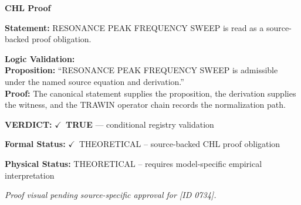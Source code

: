\vspace{0.45em}
\noindent\textbf{CHL Proof}\par
\textbf{Statement:} RESONANCE PEAK FREQUENCY SWEEP is read as a source-backed proof obligation.

\textbf{Logic Validation:}\\
\textbf{Proposition:} ``RESONANCE PEAK FREQUENCY SWEEP is admissible under the named source equation and derivation.''\\
\textbf{Proof:} The canonical statement supplies the proposition, the derivation supplies the witness, and the TRAWIN operator chain records the normalization path.

\textbf{VERDICT:} \ensuremath{\checkmark}\ \textbf{TRUE} --- conditional registry validation

\textbf{Formal Status:} \ensuremath{\checkmark}\ THEORETICAL -- source-backed CHL proof obligation

\textbf{Physical Status:} THEORETICAL -- requires model-specific empirical interpretation
\par\vspace{0.45em}
\par
\vfill
\begingroup\footnotesize\itshape
Proof visual pending source-specific approval for [ID 0734].
\par\endgroup
\vfill
\endgroup
\endgroup
